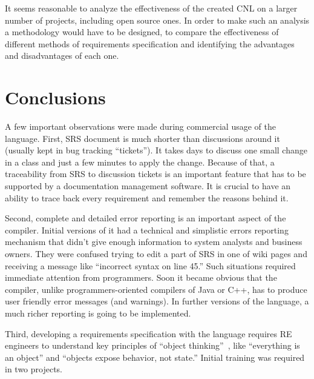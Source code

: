 \documentclass[sigplan,10pt,nonacm=true]{acmart}
\begin{document}
It seems reasonable to analyze the effectiveness of the created CNL on
a larger number of projects, including open source ones. In order to make
such an analysis a methodology would have to be designed, to compare
the effectiveness of different methods of requirements specification
and identifying the advantages and disadvantages of each one.

\section{Conclusions}
\label{sec:conclusion}

A few important observations were made during commercial usage of the language.
First, SRS document is much shorter than discussions around it (usually kept
in bug tracking ``tickets''). It takes days to discuss one small change in a
class and just a few minutes to apply the change. Because of that, a
traceability from SRS to discussion tickets is an important feature that
has to be supported by a documentation management software. It is crucial
to have an ability to trace back every requirement and remember
the reasons behind it.

Second, complete and detailed error reporting is an important aspect of
the compiler. Initial versions of it had a technical and simplistic
errors reporting mechanism that didn't give enough information to system
analysts and business owners. They were confused trying to edit a part of
SRS in one of wiki pages and receiving a message like ``incorrect syntax on
line 45.'' Such situations required immediate attention from
programmers. Soon it became obvious that the compiler, unlike
programmers-oriented compilers of Java or C++, has to produce user friendly
error messages (and warnings). In further versions of the language, a much richer
reporting is going to be implemented.

Third, developing a requirements specification with the language requires RE
engineers to understand key principles of ``object thinking''~\citep{west04},
like ``everything is an object'' and ``objects expose behavior, not state.''
Initial training was required in two projects.


\raggedright

\clearpage
\end{document}
